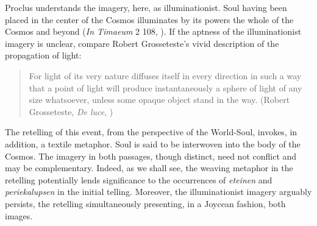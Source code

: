 Proclus understands the imagery, here, as illuminationist. Soul having been placed in the center of the Cosmos illuminates by its powers the whole of the Cosmos and beyond (\emph{In Timaeum} 2 108, \citealt{Diehl:1903re}). If the aptness of the illuminationist imagery is unclear, compare Robert Grosseteste's vivid description of the propagation of light:
\begin{quote}
	For light of its very nature diffuses itself in every direction in such a way that a point of light will produce instantaneously a sphere of light of any size whatsoever, unless some opaque object stand in the way. (Robert Grosseteste, \emph{De luce}, \citealt[10]{Riedl:1942it})
\end{quote}
The retelling of this event, from the perspective of the World-Soul, invokes, in addition, a textile metaphor. Soul is said to be interwoven into the body of the Cosmos. The imagery in both passages, though distinct, need not conflict and may be complementary. Indeed, as we shall see, the weaving metaphor in the retelling potentially lends significance to the occurrences of \emph{eteinen} and \emph{periekalupsen} in the initial telling. Moreover, the illuminationist imagery arguably persists, the retelling simultaneously presenting, in a Joycean fashion, both images.


